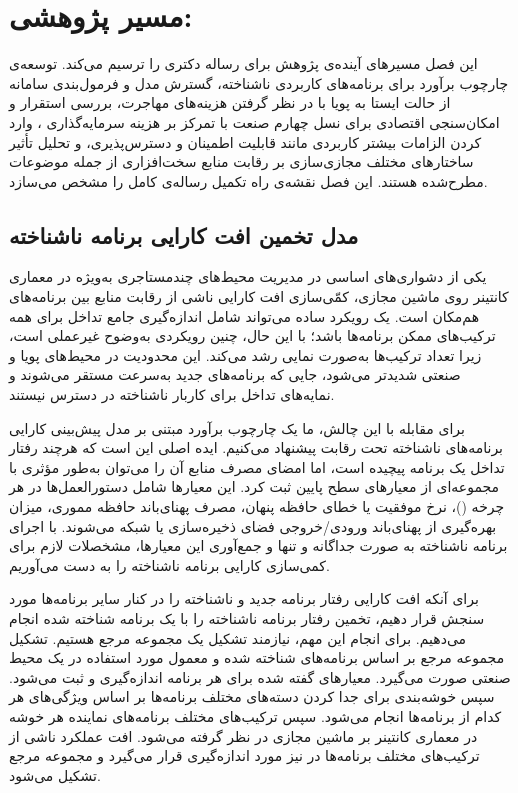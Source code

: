 
\chapter{مسیر پژوهشی:}\label{chap:future}

این فصل مسیرهای آینده‌ی پژوهش برای رساله دکتری را ترسیم می‌کند. توسعه‌ی چارچوب برآورد برای برنامه‌های کاربردی ناشناخته، گسترش مدل و فرمول‌بندی سامانه از حالت ایستا به پویا با در نظر گرفتن هزینه‌های مهاجرت، بررسی استقرار و امکان‌سنجی اقتصادی  برای نسل چهارم صنعت با تمرکز بر هزینه سرمایه‌گذاری ، وارد کردن الزامات بیشتر کاربردی مانند قابلیت اطمینان و دسترس‌پذیری، و تحلیل تأثیر ساختارهای مختلف مجازی‌سازی بر رقابت منابع سخت‌افزاری از جمله موضوعات مطرح‌شده هستند. این فصل نقشه‌ی راه تکمیل رساله‌ی کامل را مشخص می‌سازد.

\section{مدل تخمین افت کارایی برنامه ناشناخته}

یکی از دشواری‌های اساسی در مدیریت محیط‌های چندمستاجری  به‌ویژه در معماری کانتینر روی ماشین مجازی، کمّی‌سازی افت کارایی ناشی از رقابت منابع بین برنامه‌های هم‌مکان است. یک رویکرد ساده می‌تواند شامل اندازه‌گیری جامع تداخل برای همه ترکیب‌های ممکن برنامه‌ها باشد؛ با این حال، چنین رویکردی به‌وضوح غیرعملی است، زیرا تعداد ترکیب‌ها به‌صورت نمایی رشد می‌کند. این محدودیت در محیط‌های پویا و صنعتی شدیدتر می‌شود، جایی که برنامه‌های جدید به‌سرعت مستقر می‌شوند و نمایه‌های تداخل برای کاربار ناشناخته در دسترس نیستند.

برای مقابله با این چالش، ما یک چارچوب برآورد مبتنی بر مدل پیش‌بینی کارایی برنامه‌های ناشناخته تحت رقابت پیشنهاد می‌کنیم. ایده اصلی این است که هرچند رفتار تداخل یک برنامه پیچیده است، اما امضای مصرف منابع آن را می‌توان به‌طور مؤثری با مجموعه‌ای از معیار‌های سطح پایین ثبت کرد. این معیار‌ها شامل دستورالعمل‌ها در هر چرخه ()، نرخ موفقیت یا خطای حافظه پنهان، مصرف پهنای‌باند حافظه مموری، میزان بهره‌گیری از پهنای‌باند ورودی/خروجی فضای ذخیره‌سازی یا شبکه می‌شوند. با اجرای برنامه ناشناخته به صورت جداگانه و تنها و جمع‌آوری این معیار‌ها، مشخصلات لازم برای کمی‌سازی کارایی برنامه ناشناخته را به دست می‌آوریم\cite{Masouros2021Rusty}.

برای آنکه افت کارایی رفتار برنامه جدید و ناشناخته را در کنار سایر برنامه‌ها مورد سنجش قرار دهیم، تخمین رفتار برنامه ناشناخته را با یک برنامه شناخته شده انجام می‌دهیم. برای انجام این مهم، نیازمند تشکیل یک مجموعه مرجع هستیم. تشکیل مجموعه مرجع بر اساس برنامه‌های شناخته شده و معمول مورد استفاده در یک محیط صنعتی صورت می‌گیرد. معیارهای گفته شده برای هر برنامه اندازه‌گیری و ثبت می‌شود. سپس خوشه‌بندی برای جدا کردن دسته‌های مختلف برنامه‌ها بر اساس ویژگی‌های هر کدام از برنامه‌ها انجام می‌شود\cite{Masouros2021Rusty}. سپس ترکیب‌های مختلف برنامه‌های نماینده هر خوشه در معماری کانتینر بر ماشین مجازی در نظر گرفته می‌شود. افت عملکرد ناشی از ترکیب‌های مختلف برنامه‌ها در  نیز مورد اندازه‌گیری قرار می‌گیرد و مجموعه مرجع تشکیل می‌شود.

